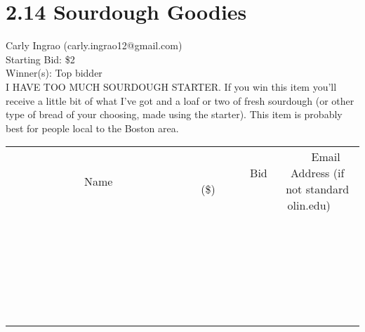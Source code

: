 \documentclass[11pt]{article}
\begin{document}
\section*{2.14 Sourdough Goodies}
Carly Ingrao (carly.ingrao12@gmail.com) \\
Starting Bid: \$2 \\
Winner(s): 
Top bidder \\
I HAVE TOO MUCH SOURDOUGH STARTER. If you win this item you'll receive a little bit of what I've got and a loaf or two of fresh sourdough (or other type of bread of your choosing, made using the starter). This item is probably best for people local to the Boston area. \\[6ex]
\begin{tabular}{c c c}
~~~~~~~~~~~~~Name~~~~~~~~~~~~~ & ~~~~~~~~~Bid (\$)~~~~~~~~~ & ~~~Email Address (if not standard olin.edu)~~~ \\
 & & \\
\hline
 & & \\
\hline
 & & \\
\hline
 & & \\
\hline
 & & \\
\hline
 & & \\
\hline
 & & \\
\hline
 & & \\
\hline
 & & \\
\hline
 & & \\
\hline
 & & \\
\hline
 & & \\
\hline
 & & \\
\hline
 & & \\
\hline
 & & \\
\hline
 & & \\
\hline
 & & \\
\hline
 & & \\
\hline
 & & \\
\hline
 & & \\
\hline
 & & \\
\hline
 & & \\
\hline
 & & \\
\hline
 & & \\
\hline
 & & \\
\hline
 & & \\
\hline
\end{tabular}
\clearpage
\end{document}
